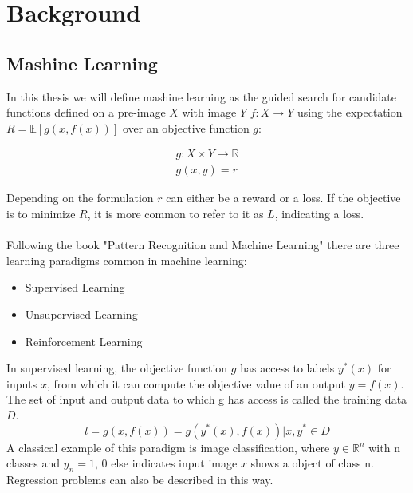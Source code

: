 
\chapter{Background}
\label{chapter:Background}
\section{Mashine Learning}
\label{section:Learning}

In this thesis we will define mashine learning as the guided search for candidate functions defined on a pre-image $X$ with image $Y$ ${f: X \rightarrow Y}$ 
using the expectation ${R = \mathbb{E}\left[g(x,f(x))\right]}$ over an objective function $g$:

\begin{equation}
    \begin{aligned}
    \label{ml_eq}
    g: X \times Y \to \mathbb{R} \\
    g(x,y) = r
    \end{aligned}
\end{equation}

Depending on the formulation $r$ can either be a reward or a loss. If the objective is to minimize $R$, it is more common to refer to it as $L$,
 indicating a loss.\\ \\
Following the book "Pattern Recognition and Machine Learning" \cite{bishop} there are three learning paradigms common in machine learning: 
\begin{itemize}
	\item Supervised Learning
	\item Unsupervised Learning
	\item Reinforcement Learning
\end{itemize} 

In supervised learning, the objective function $g$ has access to labels $y^*(x)$ for inputs $x$, from which it can compute the objective value of an output 
${y = f(x)}$. The set of input and output data to which g has access is called the training data $D$. 
\begin{equation}
    \label{supervised_paradigm}
    l = g(x, f(x)) = g(y^*(x), f(x)) | x, y^* \in D
\end{equation}
A classical example of this paradigm is image classification, where $y \in \mathbb{R}^n$ with n classes and $y_n = 1$, 0 else indicates input image $x$ shows a 
object of class n. Regression problems can also be described in this way.\\ \\

